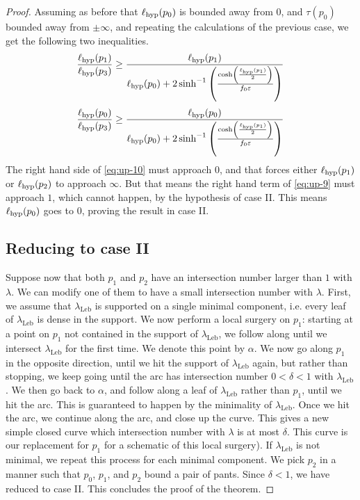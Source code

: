 \documentclass[12pt, reqno]{amsart}
\begin{document}
\begin{proof}
Assuming as before that $\ell_{\mathrm{hyp}}(p_0)$ is bounded away from $0$, and $\tau(p_0)$ bounded away from $\pm \infty$, and repeating the calculations of the previous case, we get the following two inequalities.
\begin{equation}
  \label{eq:up-9}
  \frac{\ell_{\mathrm{hyp}}(p_1)}{\ell_{\mathrm{hyp}}(p_3)} \geq \frac{\ell_{\mathrm{hyp}}(p_1) }{\ell_{\mathrm{hyp}}(p_0) +
  2 \sinh^{-1} \left( \frac{\cosh\left( \frac{\ell_{\mathrm{hyp}}(p_1)}{2} \right)}{f_0 \varepsilon} \right)
  }
\end{equation}
\begin{equation}
  \label{eq:up-10}
  \frac{\ell_{\mathrm{hyp}}(p_0)}{\ell_{\mathrm{hyp}}(p_3)} \geq \frac{\ell_{\mathrm{hyp}}(p_0)}{\ell_{\mathrm{hyp}}(p_0) +
  2 \sinh^{-1} \left( \frac{\cosh\left( \frac{\ell_{\mathrm{hyp}}(p_1)}{2} \right)}{f_0 \varepsilon} \right)
  }
\end{equation}
The right hand side of \eqref{eq:up-10} must approach $0$, and that forces either $\ell_{\mathrm{hyp}}(p_1)$ or $\ell_{\mathrm{hyp}}(p_2)$ to approach $\infty$.
But that means the right hand term of \eqref{eq:up-9} must approach $1$, which cannot happen, by the hypothesis of case II.
This means $\ell_{\mathrm{hyp}}(p_0)$ goes to $0$, proving the result in case II.

\subsection*{Reducing to case II} Suppose now that both $p_1$ and $p_2$ have an intersection number larger than $1$ with $\lambda$.
We can modify one of them to have a small intersection number with $\lambda$.
First, we assume that $\lambda_{\mathrm{Leb}}$ is supported on a single minimal component, i.e. every leaf of $\lambda_{\mathrm{Leb}}$ is dense in the support.
We now perform a local surgery on $p_1$: starting at a point on $p_1$ not contained in the support of $\lambda_{\mathrm{Leb}}$, we follow along until we intersect $\lambda_{\mathrm{Leb}}$ for the first time.
We denote this point by $\alpha$.
We now go along $p_1$ in the opposite direction, until we hit the support of $\lambda_{\mathrm{Leb}}$ again, but rather than stopping, we keep going until the arc has intersection number $0 < \delta < 1$ with $\lambda_{\mathrm{Leb}}$.
We then go back to $\alpha$, and follow along a leaf of $\lambda_{\mathrm{Leb}}$ rather than $p_1$, until we hit the arc.
This is guaranteed to happen by the minimality of $\lambda_{\mathrm{Leb}}$.
Once we hit the arc, we continue along the arc, and close up the curve.
This gives a new simple closed curve which intersection number with $\lambda$ is at most $\delta$.
This curve is our replacement for $p_1$ for a schematic of this local surgery).
If $\lambda_{\mathrm{Leb}}$ is not minimal, we repeat this process for each minimal component. We pick $p_2$ in a manner such that $p_0$, $p_1$, and $p_2$ bound a pair of pants.
Since $\delta < 1$, we have reduced to case II.
This concludes the proof of the theorem.
\end{proof}
\end{document}
